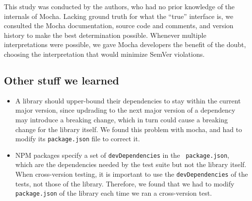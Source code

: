 This study was conducted by the authors, who had no prior knowledge of
the internals of Mocha. Lacking ground truth for what the ``true''
interface is, we consulted the Mocha documentation, source code and
comments, and version history to make the best determination
possible. Whenever multiple interpretations were possible, we gave
Mocha developers the benefit of the doubt, choosing the interpretation
that would minimize SemVer violations.

\subsection{Other stuff we learned}
\begin{itemize}
\item A library should upper-bound their dependencies to stay within
  the current major version, since updrading to the next major version
  of a dependency may introduce a breaking change, which in turn could
  cause a breaking change for the library itself. We found this
  problem with mocha, and had to modify its {\tt package.json} file to
  correct it.
\item NPM packages specify a set of {\tt devDependencies} in the {\tt
    package.json}, which are the dependencies needed by the test suite
  but not the library itself. When cross-version testing, it is
  important to use the {\tt devDependencies} of the tests, not those
  of the library. Therefore, we found that we had to modify {\tt
    package.json} of the library each time we ran a cross-version
  test.
\end{itemize}
